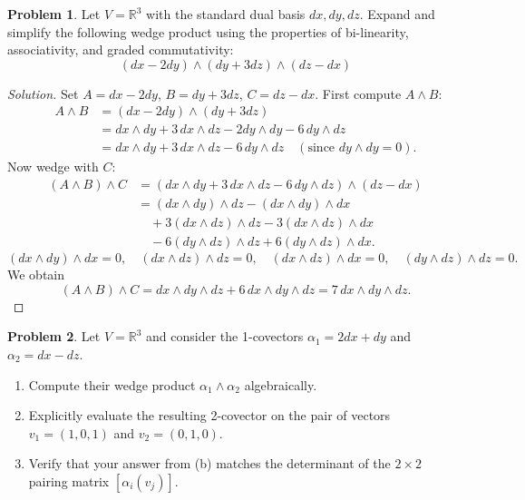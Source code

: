 \documentclass[12pt, a4paper]{article}
\theoremstyle{definition}
\newtheorem{problem}{Problem}
\newenvironment{solution}
  {\renewcommand\qedsymbol{$\blacksquare$}\begin{proof}[Solution]}
  {\end{proof}}
\begin{document}
\vfill

\begin{problem}
Let $V = \mathbb{R}^3$ with the standard dual basis $dx, dy, dz$. Expand and simplify the following wedge product using the properties of bi-linearity, associativity, and graded commutativity:
$$(dx - 2dy) \wedge (dy + 3dz) \wedge (dz - dx)$$
\end{problem}

\begin{solution}
    Set \(A = dx - 2dy\), \(B = dy + 3dz\), \(C = dz - dx\). First compute \(A \wedge B\):
    \[
    \begin{aligned}
    A \wedge B &= (dx - 2dy) \wedge (dy + 3dz) \\
    &= dx \wedge dy + 3\,dx \wedge dz - 2dy \wedge dy - 6\,dy \wedge dz \\
    &= dx \wedge dy + 3\,dx \wedge dz - 6\,dy \wedge dz \quad (\text{since } dy\wedge dy = 0).
    \end{aligned}
    \]
    Now wedge with \(C\):
    \[
    \begin{aligned}
    (A \wedge B) \wedge C &= (dx \wedge dy + 3\,dx \wedge dz - 6\,dy \wedge dz) \wedge (dz - dx) \\
    &= (dx \wedge dy) \wedge dz - (dx \wedge dy) \wedge dx \\
    &\quad + 3(dx \wedge dz) \wedge dz - 3(dx \wedge dz) \wedge dx \\
    &\quad -6(dy \wedge dz) \wedge dz + 6(dy \wedge dz) \wedge dx.
    \end{aligned}
    \]
    \[
(dx \wedge dy) \wedge dx = 0,\quad (dx \wedge dz) \wedge dz = 0,\quad (dx \wedge dz) \wedge dx = 0,\quad (dy \wedge dz) \wedge dz = 0.
\]
We obtain
\[
(A \wedge B) \wedge C = dx \wedge dy \wedge dz + 6\,dx \wedge dy \wedge dz = 7\,dx \wedge dy \wedge dz.
\]
\end{solution}

\vfill
\newpage

\begin{problem}
Let $V = \mathbb{R}^3$ and consider the 1-covectors $\alpha_1 = 2dx + dy$ and $\alpha_2 = dx - dz$. 
\begin{enumerate}
    \item[(a)] Compute their wedge product $\alpha_1 \wedge \alpha_2$ algebraically.
    \item[(b)] Explicitly evaluate the resulting 2-covector on the pair of vectors $v_1 = (1, 0, 1)$ and $v_2 = (0, 1, 0)$. 
    \item[(c)] Verify that your answer from (b) matches the determinant of the $2 \times 2$ pairing matrix $[\alpha_i(v_j)]$.
\end{enumerate}
\end{problem}
\end{document}

